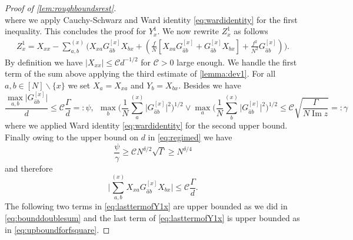 \documentclass[11pt]{article}
\DeclareMathOperator{\Ima}{Im}
\newcommand{\abs}[1]{\left| #1 \right|}
\newcommand{\absb}[1]{\bigl| #1 \bigr|}
\newcommand{\absbb}[1]{\biggl| #1 \biggr|}
\theoremstyle{plain}
\theoremstyle{remark}
\numberwithin{equation}{section}
\newcommand*\bset[1]{[#1]}
\newcommand*\ubarr[1]{{\widehat{#1}}}
\begin{document}
\begin{proof}[Proof of \cref{lem:roughboundsrest}]
\begin{equation}
		\end{equation}
		where we apply Cauchy-Schwarz and Ward identity \cref{eq:wardidentity} for the first inequality. This concludes the proof for $Y^1_x$. We now rewrite $Z^1_x$ as follows
		\begin{align}\label{eq:lasttermofY1x}
			Z^1_x = X_{xx} -\sum_{a,b}^{(x)} \biggl(X_{xa}G_{\ubarr{a}b}^{\bset{x}} X_{bx}  +\left(\frac{f}{N}\left[ X_{xa}G_{\ubarr{a}b}^{\bset{x}} + G_{\ubarr{a}b}^{\bset{x}}X_{bx} \right] + \frac{f^2}{N^2} G_{ \ubarr{a}b}^{\bset{x}}\right) \biggr).
		\end{align}
		By definition we have $\abs{X_{xx}} \le \mathcal{C}d^{-1/2}$ for $\mathcal{C} >0 $ large enough. We handle the first term of the sum above applying the third estimate of \cref{lemma:dev1}. For all $a,b\in [N] \backslash \{x\}$ we set $X_{a} = X_{xa}$ and $Y_{b} = X_{bx}$. 
		Besides we have
		\begin{equation*}
			\frac{\max_{a,b} \absb{G_{\ubarr{a}b}^{\bset{x}}}}{d} \le\mathcal{C} \frac{\Gamma}{d} =: \psi,~~\max_{b}\biggl( \frac{1}{N} \sum_{a}^{(x)} \absb{G^{\bset{x}}_{\ubarr{a}b}}^2 \biggr)^{1/2}\vee \max_{a}\biggl( \frac{1}{N}  \sum_{b}^{(x)} \absb{G^{\bset{x}}_{\ubarr{a}b}}^2 \biggr)^{1/2} \le \mathcal{C}\sqrt{\frac{\Gamma}{N\Ima z}}=: \gamma
		\end{equation*}
		where we applied Ward identity \cref{eq:wardidentity} for the second upper bound. Finally owing to the upper bound on $d$ in \cref{eq:regimed} we have
		\begin{equation*}
			 \frac{\psi}{\gamma} \ge \mathcal{C} N^{\delta/2} \sqrt{\Gamma}\ge N^{\delta/4}
		\end{equation*}
		and therefore
		\begin{equation*}
			\absbb{\sum_{a,b}^{(x)} X_{xa} G_{ \ubarr{a}b}^{\bset{x}} X_{bx} }  \le \mathcal{C}\frac{\Gamma}{d}.
		\end{equation*}
		The following two terms in \cref{eq:lasttermofY1x} are upper bounded as we did in \cref{eq:bounddoublesum} and the last term of \cref{eq:lasttermofY1x} is upper bounded as in \cref{eq:upboundforfsquare}. 
		

\end{proof}
\end{document}
